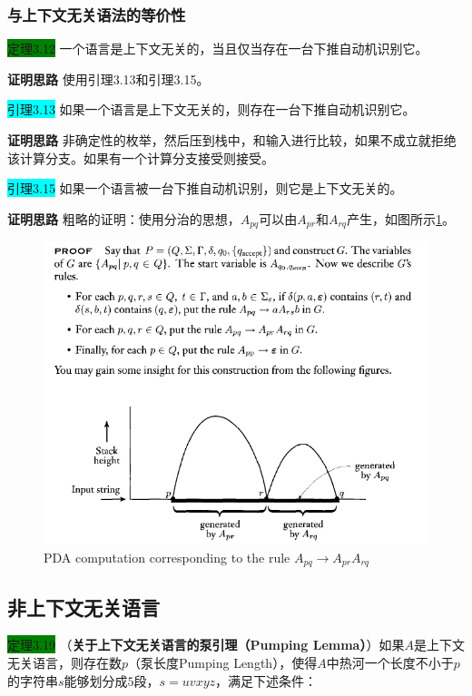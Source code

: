 \documentclass[a4paper]{article}
\begin{document}
\subsubsection{与上下文无关语法的等价性}

	\colorbox{green}{定理3.12} 一个语言是上下文无关的，当且仅当存在一台下推自动机识别它。
	
	\textbf{证明思路} \quad 使用引理3.13和引理3.15。
	
	\colorbox{cyan}{引理3.13} 如果一个语言是上下文无关的，则存在一台下推自动机识别它。
	
	\textbf{证明思路} \quad 非确定性的枚举，然后压到栈中，和输入进行比较，如果不成立就拒绝该计算分支。如果有一个计算分支接受则接受。
	
	\colorbox{cyan}{引理3.15} 如果一个语言被一台下推自动机识别，则它是上下文无关的。
	
	\textbf{证明思路} \quad 粗略的证明：使用分治的思想，$A_{pq}$可以由$A_{pr}$和$A_{rq}$产生，如图所示\ref{F030203}。
	
	\begin{figure}[htb]
		\centering
		\includegraphics[scale=0.8]{./figure/3.2.3.png}
		\caption{PDA computation corresponding to the rule $A_{pq} \rightarrow A_{pr}A_{rq}$}
		\label{F030203}
	\end{figure}

\subsection{非上下文无关语言}

	\colorbox{green}{定理3.19} （\textbf{关于上下文无关语言的泵引理（Pumping Lemma）}）如果$A$是上下文无关语言，则存在数$p$（泵长度Pumping Length），使得$A$中热河一个长度不小于$p$的字符串$s$能够划分成$5$段，$s=uvxyz$，满足下述条件：
	
\end{document}
